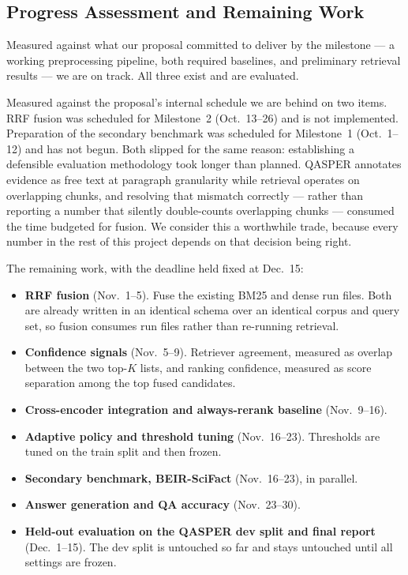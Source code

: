 \documentclass[sigconf,nonacm]{acmart}
\begin{document}
\subsection{Progress Assessment and Remaining Work}
\label{sec:plan}

Measured against what our proposal committed to deliver by the milestone --- a
working preprocessing pipeline, both required baselines, and preliminary
retrieval results --- we are on track. All three exist and are evaluated.

Measured against the proposal's internal schedule we are behind on two items.
RRF fusion was scheduled for Milestone~2 (Oct.~13--26) and is not implemented.
Preparation of the secondary benchmark was scheduled for Milestone~1
(Oct.~1--12) and has not begun. Both slipped for the same reason: establishing a
defensible evaluation methodology took longer than planned. QASPER annotates
evidence as free text at paragraph granularity while retrieval operates on
overlapping chunks, and resolving that mismatch correctly --- rather than
reporting a number that silently double-counts overlapping chunks --- consumed
the time budgeted for fusion. We consider this a worthwhile trade, because every
number in the rest of this project depends on that decision being right.

The remaining work, with the deadline held fixed at Dec.~15:

\begin{itemize}
\item \textbf{RRF fusion} (Nov.~1--5). Fuse the existing BM25 and dense run
files. Both are already written in an identical schema over an identical corpus
and query set, so fusion consumes run files rather than re-running retrieval.
\item \textbf{Confidence signals} (Nov.~5--9). Retriever agreement, measured as
overlap between the two top-$K$ lists, and ranking confidence, measured as score
separation among the top fused candidates.
\item \textbf{Cross-encoder integration and always-rerank baseline}
(Nov.~9--16).
\item \textbf{Adaptive policy and threshold tuning} (Nov.~16--23). Thresholds
are tuned on the train split and then frozen.
\item \textbf{Secondary benchmark, BEIR-SciFact} (Nov.~16--23), in parallel.
\item \textbf{Answer generation and QA accuracy} (Nov.~23--30).
\item \textbf{Held-out evaluation on the QASPER dev split and final report}
(Dec.~1--15). The dev split is untouched so far and stays untouched until all
settings are frozen.
\end{itemize}
\end{document}
